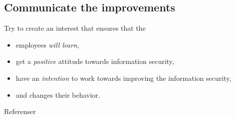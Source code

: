 \documentclass{beamer}
\begin{document}
\subsection{Communicate the improvements}
\begin{frame}{\insertsubsectionhead}
  Try to create an interest that ensures that the
  \begin{itemize}
    \item employees \emph{will learn},
    \item get a \emph{positive} attitude towards information security,
    \item have an \emph{intention} to work towards improving the information
      security,
    \item and changes their behavior.
  \end{itemize}
\end{frame}


\begin{frame}[allowframebreaks]{Referenser}
	\small
  \printbibliography{}
\end{frame}
\end{document}
